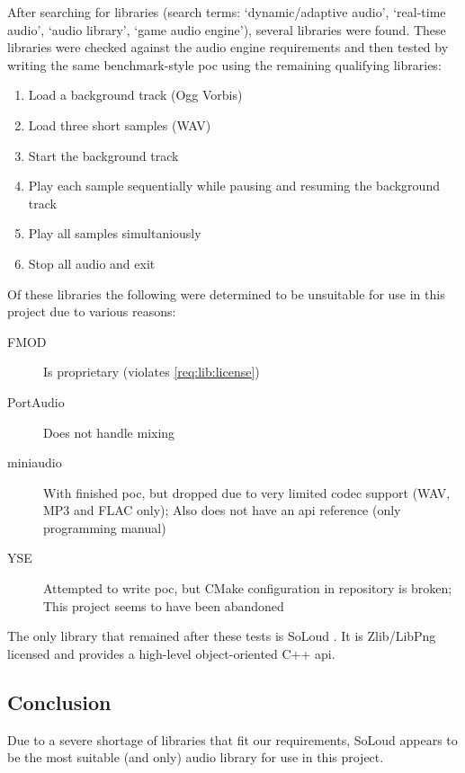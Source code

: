 \documentclass{projdoc}
\begin{document}
After searching for libraries (search terms: `dynamic/adaptive audio', `real-time
audio', `audio library', `game audio engine'), several libraries were found. These
libraries were checked against the audio engine requirements
\autocite{crepe:requirements} and then tested by writing the same benchmark-style
\gls{poc} using the remaining qualifying libraries:\noparbreak
\begin{enumerate}
	\item Load a background track (Ogg Vorbis)
	\item Load three short samples (WAV)
	\item Start the background track
	\item Play each sample sequentially while pausing and resuming the background track
	\item Play all samples simultaniously
	\item Stop all audio and exit
\end{enumerate}

Of these libraries the following were determined to be unsuitable for use in this
project due to various reasons:\noparbreak
\begin{description}
	\item[FMOD \autocite{lib:fmod}] Is proprietary (violates \cref{req:lib:license})
	\item[PortAudio \autocite{lib:portaudio}] Does not handle mixing
	\item[miniaudio \autocite{lib:miniaudio}] With finished \gls{poc}, but dropped due
		to very limited codec support (WAV, MP3 and FLAC only); Also does not have an
		\gls{api} reference (only programming manual)
	\item[YSE \autocite{lib:yse}] Attempted to write \gls{poc}, but CMake configuration
		in repository is broken; This project seems to have been abandoned
\end{description}

The only library that remained after these tests is SoLoud \autocite{lib:soloud}. It
is Zlib/LibPng licensed and provides a high-level object-oriented C++ \gls{api}.

\subsection{Conclusion}
\label{sec:audio:conclusion}

Due to a severe shortage of libraries that fit our requirements, SoLoud appears to be
the most suitable (and only) audio library for use in this project.
\end{document}
